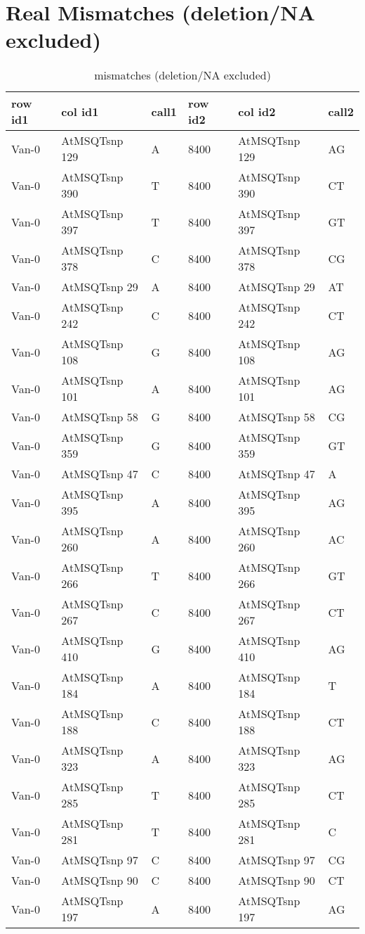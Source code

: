 \section{Real Mismatches (deletion/NA excluded)} \label{section_real_mismatch}
\begin{center}
\begin{longtable}{|l|l|l|l|l|l|}
\caption{mismatches (deletion/NA excluded)} \label{table_dm1}\\
\hline
row id1&col id1&call1&row id2&col id2&call2\\
\hline
Van-0&AtMSQTsnp 129&A&8400&AtMSQTsnp 129&AG\\
Van-0&AtMSQTsnp 390&T&8400&AtMSQTsnp 390&CT\\
Van-0&AtMSQTsnp 397&T&8400&AtMSQTsnp 397&GT\\
Van-0&AtMSQTsnp 378&C&8400&AtMSQTsnp 378&CG\\
Van-0&AtMSQTsnp 29&A&8400&AtMSQTsnp 29&AT\\
Van-0&AtMSQTsnp 242&C&8400&AtMSQTsnp 242&CT\\
Van-0&AtMSQTsnp 108&G&8400&AtMSQTsnp 108&AG\\
Van-0&AtMSQTsnp 101&A&8400&AtMSQTsnp 101&AG\\
Van-0&AtMSQTsnp 58&G&8400&AtMSQTsnp 58&CG\\
Van-0&AtMSQTsnp 359&G&8400&AtMSQTsnp 359&GT\\
Van-0&AtMSQTsnp 47&C&8400&AtMSQTsnp 47&A\\
Van-0&AtMSQTsnp 395&A&8400&AtMSQTsnp 395&AG\\
Van-0&AtMSQTsnp 260&A&8400&AtMSQTsnp 260&AC\\
Van-0&AtMSQTsnp 266&T&8400&AtMSQTsnp 266&GT\\
Van-0&AtMSQTsnp 267&C&8400&AtMSQTsnp 267&CT\\
Van-0&AtMSQTsnp 410&G&8400&AtMSQTsnp 410&AG\\
Van-0&AtMSQTsnp 184&A&8400&AtMSQTsnp 184&T\\
Van-0&AtMSQTsnp 188&C&8400&AtMSQTsnp 188&CT\\
Van-0&AtMSQTsnp 323&A&8400&AtMSQTsnp 323&AG\\
Van-0&AtMSQTsnp 285&T&8400&AtMSQTsnp 285&CT\\
Van-0&AtMSQTsnp 281&T&8400&AtMSQTsnp 281&C\\
Van-0&AtMSQTsnp 97&C&8400&AtMSQTsnp 97&CG\\
Van-0&AtMSQTsnp 90&C&8400&AtMSQTsnp 90&CT\\
Van-0&AtMSQTsnp 197&A&8400&AtMSQTsnp 197&AG\\

\end{longtable}
\end{center}
